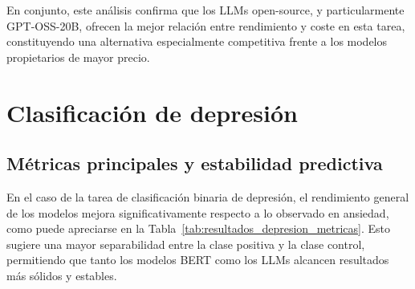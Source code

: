 En conjunto, este análisis confirma que los LLMs open-source, y particularmente GPT-OSS-20B, ofrecen la mejor relación entre rendimiento y coste en esta tarea, constituyendo una alternativa especialmente competitiva frente a los modelos propietarios de mayor precio.


\section{Clasificación de depresión}

\subsection{Métricas principales y estabilidad predictiva}

En el caso de la tarea de clasificación binaria de depresión, el rendimiento general de los modelos mejora significativamente respecto a lo observado en ansiedad, como puede apreciarse en la Tabla~\ref{tab:resultados_depresion_metricas}. Esto sugiere una mayor separabilidad entre la clase positiva y la clase control, permitiendo que tanto los modelos BERT como los \acp{LLM} alcancen resultados más sólidos y estables.

